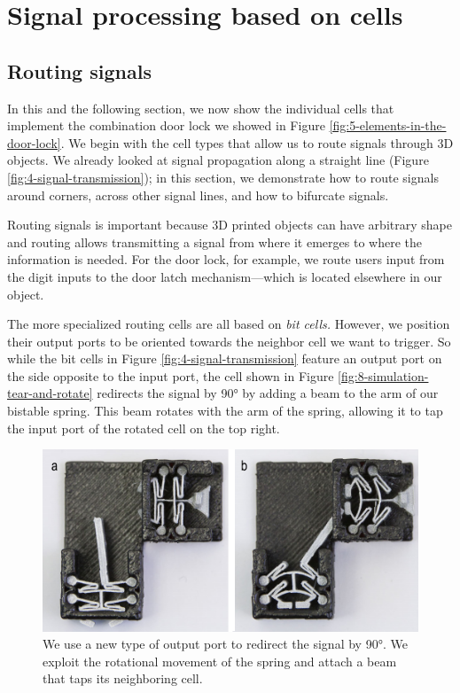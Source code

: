 \section{Signal processing based on cells}

\subsection{Routing signals}

In this and the following section, we now show the individual cells that implement the combination door lock we showed in Figure \ref{fig:5-elements-in-the-door-lock}. We begin with the cell types that allow us to route signals through 3D objects. We already looked at signal propagation along a straight line (Figure \ref{fig:4-signal-transmission}); in this section, we demonstrate how to route signals around corners, across other signal lines, and how to bifurcate signals. 

Routing signals is important because 3D printed objects can have arbitrary shape and routing allows transmitting a signal from where it emerges to where the information is needed. For the door lock, for example, we route users input from the digit inputs to the door latch mechanism---which is located elsewhere in our object.

The more specialized routing cells are all based on \textit{bit cells.} However, we position their output ports to be oriented towards the neighbor cell we want to trigger. So while the bit cells in Figure \ref{fig:4-signal-transmission} feature an output port on the side opposite to the input port, the cell shown in Figure \ref{fig:8-simulation-tear-and-rotate} redirects the signal by 90° by adding a beam to the arm of our bistable spring. This beam rotates with the arm of the spring, allowing it to tap the input port of the rotated cell on the top right.

\begin{figure} [h]  
    \includegraphics[width=\textwidth]{chapters/digital-metamaterials-FIG/8-signal-redirecting-90deg-2D.pdf}
    \caption[Short figure name.]{We use a new type of output port to redirect the signal by 90°. We exploit the rotational movement of the spring and attach a beam that taps its neighboring cell.
    \label{fig:8-signal-redirecting-90deg-2D}}
\end{figure}


